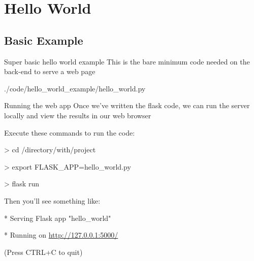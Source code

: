 \documentclass{beamer}
\begin{document}
\section{Hello World}

\subsection{Basic Example}
	\begin{frame}[t]{Super basic hello world example}
		This is the bare minimum code needed on the back-end to serve a web
		page
		\begin{block}{./code/hello\_world\_example/hello\_world.py}
			
		\end{block}
	\end{frame}


	\begin{frame}[t]{Running the web app}
		Once we've written the flask code, we can run the server locally and
		view the results in our web browser
		\pause

		\begin{block}{Execute these commands to run the code:}
			\begin{semiverbatim}
				> cd /directory/with/project

				> export FLASK\_APP=hello\_world.py

				> flask run
			\end{semiverbatim}
		\end{block}
		\pause

		\begin{block}{Then you'll see something like:}
			\begin{semiverbatim}
				* Serving Flask app "hello\_world"

				* Running on \url{http://127.0.0.1:5000/}

					(Press CTRL+C to quit)
			\end{semiverbatim}
		\end{block}
	\end{frame}
\end{document}
